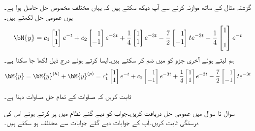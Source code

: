 گزشتہ مثال کے ساتھ موازنہ کرنے سے آپ دیکھ سکتے ہیں کہ یہاں مختلف مخصوص حل  حاصل ہوا ہے۔یوں عمومی حل  لکھتے ہیں۔
\begin{align*}
\bM{y}=c_1\begin{bmatrix}1\\1  \end{bmatrix}e^{-t}+c_2\begin{bmatrix*}[r]1\\-1  \end{bmatrix*}e^{-3t}+\frac{1}{4} \begin{bmatrix}1\\1  \end{bmatrix}e^{-3t}-\frac{7}{2}\begin{bmatrix*}[r]1\\ -1  \end{bmatrix*}te^{-3t}-\frac{1}{4}\begin{bmatrix}1\\[1em] 1  \end{bmatrix}e^{-t}
\end{align*}
ہم  لیتے ہوئے  آخری جزو کو  میں ضم کر سکتے ہیں۔ایسا کرتے ہوئے درج ذیل لکھا جا سکتا ہے۔
\begin{align}
\bM{y}=\bM{y}^{(h)}+\bM{y}^{(p)}=c_1^*\begin{bmatrix}1\\1  \end{bmatrix}e^{-t}+c_2\begin{bmatrix*}[r]1\\-1  \end{bmatrix*}e^{-3t}+\frac{1}{4} \begin{bmatrix}1\\1  \end{bmatrix}e^{-3t}-\frac{7}{2}\begin{bmatrix*}[r]1\\ -1  \end{bmatrix*}te^{-3t}
\end{align}


ثابت کریں کہ مساوات  کے تمام حل مساوات  دیتا ہے۔

سوال  تا سوال  میں عمومی حل دریافت کریں۔جواب کو دیے گئے نظام میں پر کرتے ہوئے اس کی درستگی  ثابت کریں۔آپ کے جوابات دیے گئے جوابات سے مختلف ہو سکتے ہیں۔

